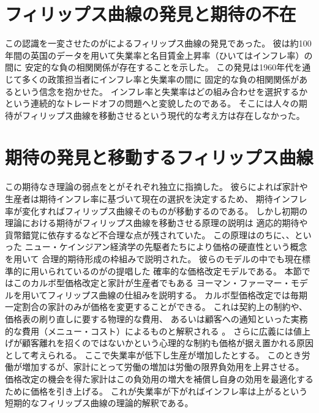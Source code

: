 \section{フィリップス曲線の発見と期待の不在}
\label{sec:chapter2_review_discovery_of_phillips_curve}
この認識を一変させたのが\textcite{Phillips1958}によるフィリップス曲線の発見であった。
彼は約100年間の英国のデータを用いて失業率と名目賃金上昇率（ひいてはインフレ率）の間に
安定的な負の相関関係が存在することを示した。
この発見は1960年代を通じて多くの政策担当者にインフレ率と失業率の間に
固定的な負の相関関係があるという信念を抱かせた。
インフレ率と失業率はどの組み合わせを選択するかという連続的なトレードオフの問題へと変貌したのである。
そこには人々の期待がフィリップス曲線を移動させるという現代的な考え方は存在しなかった。

\section{期待の発見と移動するフィリップス曲線}
\label{sec:chapter2_review_shifting_phillips_curve}
この期待なき理論の弱点を\textcite{Friedman1968}と\textcite{Phelps1968}がそれぞれ独立に指摘した。
彼らによれば家計や生産者は期待インフレ率に基づいて現在の選択を決定するため、
期待インフレ率が変化すればフィリップス曲線そのものが移動するのである。
しかし初期の理論における期待がフィリップス曲線を移動させる原理の説明は
適応的期待や貨幣錯覚に依存するなど不合理な点が残されていた。
この原理はのちに\textcite{Fischer1977}、\textcite{Taylor1980}、\textcite{Calvo1983}といった
ニュー・ケインジアン経済学の先駆者たちにより価格の硬直性という概念を用いて
合理的期待形成の枠組みで説明された\parencite[この理論的変遷については][を参照]{ClaridaGaliGertler1999}。
彼らのモデルの中でも現在標準的に用いられているのが\textcite{Calvo1983}の提唱した
確率的な価格改定モデルである。
本節ではこのカルボ型価格改定と家計が生産者でもある
ヨーマン・ファーマー・モデルを用いてフィリップス曲線の仕組みを説明する。
カルボ型価格改定では毎期一定割合の家計のみが価格を変更することができる。
これは契約上の制約や、価格表の刷り直しに要する物理的な費用、
あるいは顧客への通知といった実務的な費用（メニュー・コスト）によるものと解釈される
\parencite{ClaridaGaliGertler1999,GoodfriendKing1997}。
さらに広義には値上げが顧客離れを招くのではないかという心理的な制約も価格が据え置かれる原因として考えられる。
ここで失業率が低下し生産が増加したとする。
このとき労働が増加するが、家計にとって労働の増加は労働の限界負効用を上昇させる。
価格改定の機会を得た家計はこの負効用の増大を補償し自身の効用を最適化するために価格を引き上げる。
これが失業率が下がればインフレ率は上がるという短期的なフィリップス曲線の理論的解釈である。
